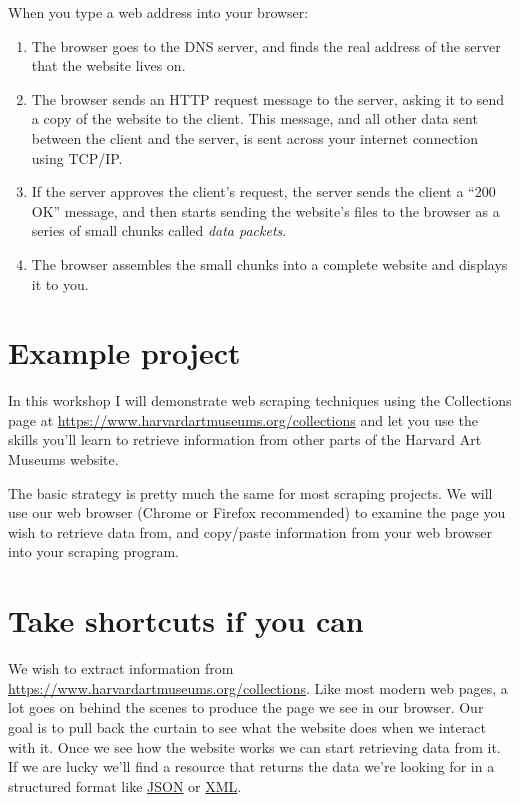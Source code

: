 \documentclass[]{book}
\providecommand{\tightlist}{%
  \setlength{\itemsep}{0pt}\setlength{\parskip}{0pt}}
\begin{document}
When you type a web address into your browser:

\begin{enumerate}
\def\labelenumi{\arabic{enumi}.}
\tightlist
\item
  The browser goes to the DNS server, and finds the real address of the server that the website lives on.
\item
  The browser sends an HTTP request message to the server, asking it to send a copy of the website to the client. This message, and all other data sent between the client and the server, is sent across your internet connection using TCP/IP.
\item
  If the server approves the client's request, the server sends the client a ``200 OK'' message, and then starts sending the website's files to the browser as a series of small chunks called \emph{data packets}.
\item
  The browser assembles the small chunks into a complete website and displays it to you.
\end{enumerate}

\hypertarget{example-project}{%
\section{Example project}\label{example-project}}

In this workshop I will demonstrate web scraping techniques using the
Collections page at
\url{https://www.harvardartmuseums.org/collections} and let you use
the skills you'll learn to retrieve information from other parts of
the Harvard Art Museums website.

The basic strategy is pretty much the same for most scraping projects.
We will use our web browser (Chrome or Firefox recommended) to examine
the page you wish to retrieve data from, and copy/paste information
from your web browser into your scraping program.

\hypertarget{take-shortcuts-if-you-can}{%
\section{Take shortcuts if you can}\label{take-shortcuts-if-you-can}}

We wish to extract information from
\url{https://www.harvardartmuseums.org/collections}. Like most
modern web pages, a lot goes on behind the scenes to produce the page
we see in our browser. Our goal is to pull back the curtain to see
what the website does when we interact with it. Once we see how the
website works we can start retrieving data from it. If we are lucky
we'll find a resource that returns the data we're looking for in a
structured format like \href{https://json.org/}{JSON} or
\href{https://en.wikipedia.org/wiki/XML}{XML}.
\end{document}
